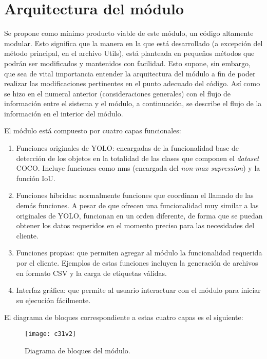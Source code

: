 \section{Arquitectura del módulo}

Se propone como mínimo producto viable de este módulo, un código altamente modular. Esto significa que la manera en la que está desarrollado (a excepción del método principal, en el archivo Utils), está planteada en pequeños métodos que podrán ser modificados y mantenidos con facilidad. Esto supone, sin embargo, que sea de vital importancia entender la arquitectura del módulo a fin de poder realizar las modificaciones pertinentes en el punto adecuado del código. Así como se hizo en el numeral anterior (consideraciones generales) con el flujo de información entre el sistema y el módulo, a continuación, se describe el flujo de la información en el interior del módulo.   

El módulo está compuesto por cuatro capas funcionales:

\begin{enumerate}

	\item Funciones originales de YOLO: encargadas de la funcionalidad base de detección de los objetos en la totalidad de las clases que componen el \textit{dataset} COCO. Incluye funciones como nms (encargada del \textit{non-max supression}) y la función IoU. 
	\item Funciones híbridas: normalmente funciones que coordinan el llamado de las demás funciones. A pesar de que ofrecen una funcionalidad muy similar a las originales de YOLO, funcionan en un orden diferente, de forma que se puedan obtener los datos requeridos en el momento preciso para las necesidades del cliente.  
	\item Funciones propias: que permiten agregar al módulo la funcionalidad requerida por el cliente. Ejemplos de estas funciones incluyen la generación de archivos en formato CSV y la carga de etiquetas válidas. 
	\item Interfaz gráfica: que permite al usuario interactuar con el módulo para iniciar su ejecución fácilmente. 

\end{enumerate}

El diagrama de bloques correspondiente a estas cuatro capas es el siguiente:

\begin{figure}[!ht]
    \centering
    \texttt{[image: c31v2]}
    \caption{Diagrama de bloques del módulo.}
    \label{fig:mesh1}
\end{figure}


